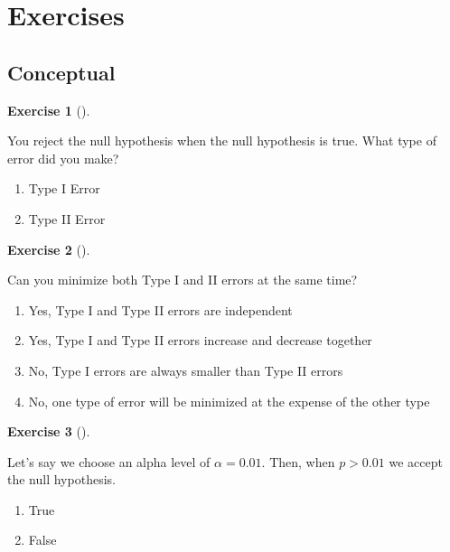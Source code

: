 \documentclass[
  letterpaper,
  DIV=11,
  numbers=noendperiod]{scrreprt}
\providecommand{\tightlist}{%
  \setlength{\itemsep}{0pt}\setlength{\parskip}{0pt}}\usepackage{longtable,booktabs,array}
\theoremstyle{definition}
\newtheorem{exercise}{Exercise}[chapter]
\theoremstyle{remark}
\begin{document}
\hypertarget{sec-ex12}{%
\section{Exercises}\label{sec-ex12}}

\hypertarget{sec-ex12-conceptual}{%
\subsection{Conceptual}\label{sec-ex12-conceptual}}

\begin{exercise}[]\protect\hypertarget{exr-ch12-c01}{}\label{exr-ch12-c01}

You reject the null hypothesis when the null hypothesis is true. What
type of error did you make?

\begin{enumerate}
\def\labelenumi{\alph{enumi})}
\tightlist
\item
  Type I Error
\item
  Type II Error
\end{enumerate}

\end{exercise}

\begin{exercise}[]\protect\hypertarget{exr-ch12-c02}{}\label{exr-ch12-c02}

Can you minimize both Type I and II errors at the same time?

\begin{enumerate}
\def\labelenumi{\alph{enumi})}
\tightlist
\item
  Yes, Type I and Type II errors are independent
\item
  Yes, Type I and Type II errors increase and decrease together
\item
  No, Type I errors are always smaller than Type II errors
\item
  No, one type of error will be minimized at the expense of the other
  type
\end{enumerate}

\end{exercise}

\begin{exercise}[]\protect\hypertarget{exr-ch12-c03}{}\label{exr-ch12-c03}

Let's say we choose an alpha level of \(\alpha = 0.01\). Then, when
\(p > 0.01\) we accept the null hypothesis.

\begin{enumerate}
\def\labelenumi{\alph{enumi})}
\tightlist
\item
  True
\item
  False
\end{enumerate}

\end{exercise}
\end{document}
